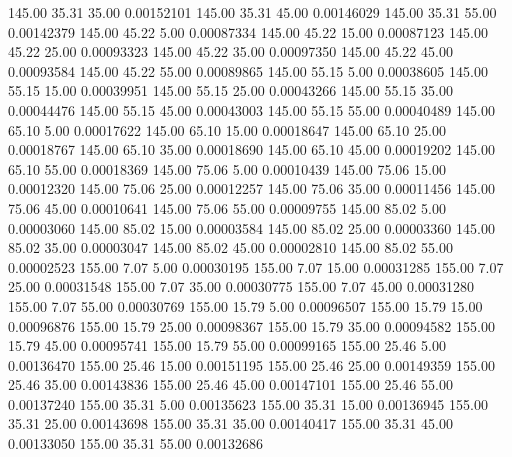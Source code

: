     145.00     35.31     35.00     0.00152101
    145.00     35.31     45.00     0.00146029
    145.00     35.31     55.00     0.00142379
    145.00     45.22      5.00     0.00087334
    145.00     45.22     15.00     0.00087123
    145.00     45.22     25.00     0.00093323
    145.00     45.22     35.00     0.00097350
    145.00     45.22     45.00     0.00093584
    145.00     45.22     55.00     0.00089865
    145.00     55.15      5.00     0.00038605
    145.00     55.15     15.00     0.00039951
    145.00     55.15     25.00     0.00043266
    145.00     55.15     35.00     0.00044476
    145.00     55.15     45.00     0.00043003
    145.00     55.15     55.00     0.00040489
    145.00     65.10      5.00     0.00017622
    145.00     65.10     15.00     0.00018647
    145.00     65.10     25.00     0.00018767
    145.00     65.10     35.00     0.00018690
    145.00     65.10     45.00     0.00019202
    145.00     65.10     55.00     0.00018369
    145.00     75.06      5.00     0.00010439
    145.00     75.06     15.00     0.00012320
    145.00     75.06     25.00     0.00012257
    145.00     75.06     35.00     0.00011456
    145.00     75.06     45.00     0.00010641
    145.00     75.06     55.00     0.00009755
    145.00     85.02      5.00     0.00003060
    145.00     85.02     15.00     0.00003584
    145.00     85.02     25.00     0.00003360
    145.00     85.02     35.00     0.00003047
    145.00     85.02     45.00     0.00002810
    145.00     85.02     55.00     0.00002523
    155.00      7.07      5.00     0.00030195
    155.00      7.07     15.00     0.00031285
    155.00      7.07     25.00     0.00031548
    155.00      7.07     35.00     0.00030775
    155.00      7.07     45.00     0.00031280
    155.00      7.07     55.00     0.00030769
    155.00     15.79      5.00     0.00096507
    155.00     15.79     15.00     0.00096876
    155.00     15.79     25.00     0.00098367
    155.00     15.79     35.00     0.00094582
    155.00     15.79     45.00     0.00095741
    155.00     15.79     55.00     0.00099165
    155.00     25.46      5.00     0.00136470
    155.00     25.46     15.00     0.00151195
    155.00     25.46     25.00     0.00149359
    155.00     25.46     35.00     0.00143836
    155.00     25.46     45.00     0.00147101
    155.00     25.46     55.00     0.00137240
    155.00     35.31      5.00     0.00135623
    155.00     35.31     15.00     0.00136945
    155.00     35.31     25.00     0.00143698
    155.00     35.31     35.00     0.00140417
    155.00     35.31     45.00     0.00133050
    155.00     35.31     55.00     0.00132686
